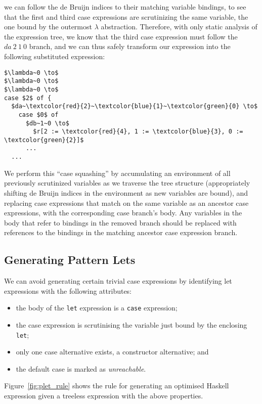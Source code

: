 we can follow the de Bruijn indices to their matching variable bindings, to see that the first and third case expressions are scrutinizing the same variable, the one bound by the outermost $\lambda$ abstraction. Therefore, with only static analysis of the expression tree, we know that the third case expression must follow the $da~2~1~0$ branch, and we can thus safely transform our expression into the following substituted expression:

\begin{lstlisting}[style=math]
$\lambda~0 \to$
$\lambda~0 \to$
$\lambda~0 \to$
case $2$ of {
  $da~\textcolor{red}{2}~\textcolor{blue}{1}~\textcolor{green}{0} \to$
    case $0$ of
      $db~1~0 \to$
        $r[2 := \textcolor{red}{4}, 1 := \textcolor{blue}{3}, 0 := \textcolor{green}{2}]$
      ...
  ...
\end{lstlisting}

We perform this ``case squashing'' by accumulating an environment of all previously scrutinized variables as we traverse the tree structure (appropriately shifting de Bruijn indices in the environment as new variables are bound), and replacing case expressions that match on the same variable as an ancestor case expressions, with the corresponding case branch's body. Any variables in the body that refer to bindings in the removed branch should be replaced with references to the bindings in the matching ancestor case expression branch.

\subsection{Generating Pattern Lets}
\label{sub:logical_plet}

We can avoid generating certain trivial case expressions by identifying let expressions with the following attributes:
\begin{itemize}
  \item the body of the \lstinline{let} expression is a \lstinline{case} expression;
  \item the case expression is scrutinising the variable just bound by the enclosing \lstinline{let};
  \item only one case alternative exists, a constructor alternative; and
  \item the default case is marked as \textit{unreachable}.
\end{itemize}

Figure~\ref{fig:plet_rule} shows the rule for generating an optimised Haskell expression given a treeless expression with the above properties.

